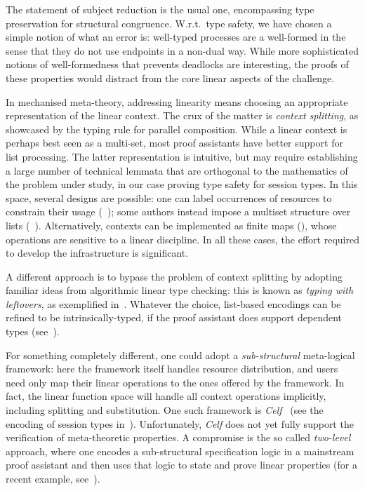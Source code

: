 \documentclass[runningheads]{llncs}
\begin{document}
The statement of subject reduction is the usual one, encompassing type
preservation for structural congruence. W.r.t.\ type safety, we have
chosen a simple notion of what an error is: well-typed processes are a
well-formed in the sense that they do not use endpoints in a non-dual
way.  While more sophisticated notions of well-formedness that
prevents deadlocks are interesting, the proofs of these properties
would distract from the core linear aspects of the challenge.


In mechanised meta-theory, addressing linearity means choosing an
appropriate representation of the linear context.  The crux of the
matter is \emph{context splitting}, as showcased by the typing rule
for parallel composition.  While a linear context is perhaps best seen
as a multi-set, most proof assistants have better support for list
processing.  The latter representation is intuitive, but may require
establishing a large number of technical lemmata that are orthogonal
to the mathematics of the problem under study, in our case proving
type safety for session types.  In this space, several designs are
possible: one can label occurrences of resources to constrain their
usage (\eg~\cite{CicconeP20}); some authors instead impose a multiset
structure over lists
(\eg~\cite{Danielsson12,ChaudhuriLR19}). Alternatively, contexts can
be implemented as finite maps (\cite{Castro2020}), whose operations
are sensitive to a linear discipline. In all these cases, the effort
required to develop the infrastructure is significant.

A different approach is to bypass the problem of context splitting by adopting familiar ideas from algorithmic linear type checking: this is known as \emph{typing with leftovers}, as exemplified in~\cite{DBLP:conf/forte/ZalakainD21}.
Whatever the choice, list-based encodings can be refined to be intrinsically-typed, if the proof assistant does support dependent types (see~\cite{Thiemann2019,CicconeP20,RouvoetPKV20}).

For something completely different, one could adopt a \emph{sub-structural} meta-logical framework: here the framework itself handles resource distribution, and users need only map their linear operations to the ones offered by the framework.
In fact, the linear function space will handle all context operations implicitly, including splitting and substitution.
One such framework is \emph{Celf}~\cite{Schack-Nielsen:IJCAR08} (see the encoding of session types in~\cite{Bock2016}).
Unfortunately, \emph{Celf} does not yet fully support the verification of meta-theoretic properties.
A compromise is the so called \emph{two-level} approach, where one encodes a sub-structural specification logic in a mainstream proof assistant and then uses that logic to state and prove linear properties (for a recent example, see~\cite{Felty:MSCS21}).
\end{document}
